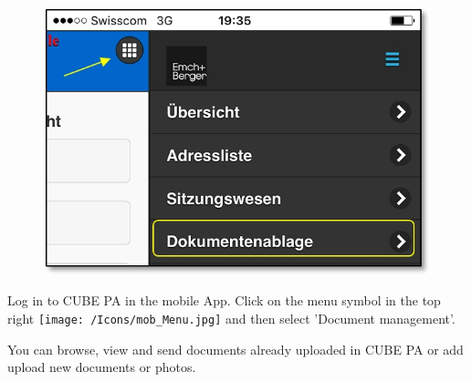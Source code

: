 \begin{figure}   %
  \vspace{-35pt}      %
  \begin{center}
    \includegraphics[width=1\linewidth]{../chapters/11_Dokumentenablage/pictures/11-mob01_Dokumentenablage_oeffnen.jpg}
  \end{center}
  \vspace{-20pt}
  \vspace{-10pt}
\end{figure}

Log in to CUBE PA in the mobile App. Click on the menu symbol in the top right \texttt{[image: /Icons/mob\_Menu.jpg]} and then select 'Document management'.

\vspace{.5cm}

You can browse, view and send documents already uploaded in CUBE PA or add upload new documents or photos.

\vspace{\baselineskip}

